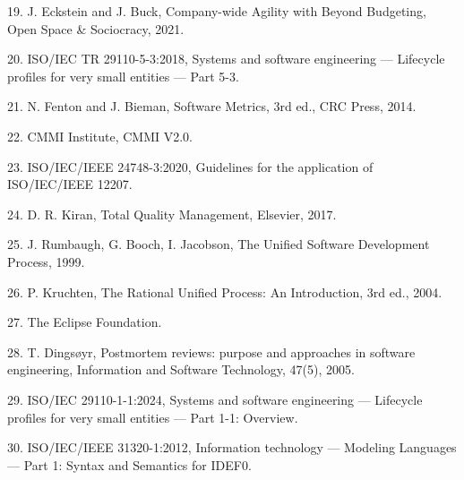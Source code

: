 19. J. Eckstein and J. Buck, Company-wide Agility with Beyond Budgeting, Open Space \& Sociocracy, 2021.

20. ISO/IEC TR 29110-5-3:2018, Systems and software engineering — Lifecycle profiles for very small entities — Part 5-3.

21. N. Fenton and J. Bieman, Software Metrics, 3rd ed., CRC Press, 2014.

22. CMMI Institute, CMMI V2.0.

23. ISO/IEC/IEEE 24748-3:2020, Guidelines for the application of ISO/IEC/IEEE 12207.

24. D. R. Kiran, Total Quality Management, Elsevier, 2017.

25. J. Rumbaugh, G. Booch, I. Jacobson, The Unified Software Development Process, 1999.

26. P. Kruchten, The Rational Unified Process: An Introduction, 3rd ed., 2004.

27. The Eclipse Foundation.

28. T. Dingsøyr, Postmortem reviews: purpose and approaches in software engineering, Information and Software Technology, 47(5), 2005.

29. ISO/IEC 29110-1-1:2024, Systems and software engineering — Lifecycle profiles for very small entities — Part 1-1: Overview.

30. ISO/IEC/IEEE 31320-1:2012, Information technology — Modeling Languages — Part 1: Syntax and Semantics for IDEF0.
